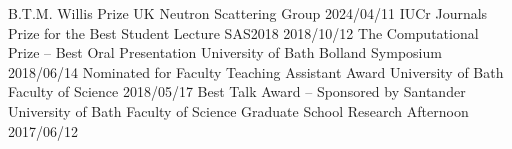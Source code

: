 \begin{cvpubs}
    {B.T.M. Willis Prize}
    {UK Neutron Scattering Group}
    {2024/04/11}
  \cvpub
    {IUCr Journals Prize for the Best Student Lecture}
    {SAS2018}
    {2018/10/12}
  \cvpub
    {The Computational Prize -- Best Oral Presentation}
    {University of Bath Bolland Symposium}
    {2018/06/14}
  \cvpub
    {Nominated for Faculty Teaching Assistant Award}
    {University of Bath Faculty of Science}
    {2018/05/17}
  \cvpub
    {Best Talk Award -- Sponsored by Santander}
    {University of Bath Faculty of Science Graduate School Research Afternoon}
    {2017/06/12}
\end{cvpubs}